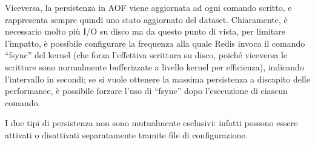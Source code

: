 Viceversa, la persistenza in AOF viene aggiornata ad ogni comando scritto, e rappresenta sempre
quindi uno stato aggiornato del dataset. Chiaramente, è necessario molto più I/O su disco ma
da questo punto di vista, per limitare l'impatto, è possibile configurare la frequenza alla
quale Redis invoca il comando ``fsync'' del kernel (che forza l'effettiva scrittura su
disco, poiché viceversa le scritture sono normalmente bufferizzate a livello kernel per
efficienza), indicando l'intervallo in secondi; se si vuole ottenere la massima persistenza a
discapito delle performance, è possibile forzare l'uso di ``fsync'' dopo l'esecuzione di
ciascun comando.

I due tipi di persistenza non sono mutualmente esclusivi: infatti possono essere attivati o 
disattivati separatamente tramite file di configurazione.





